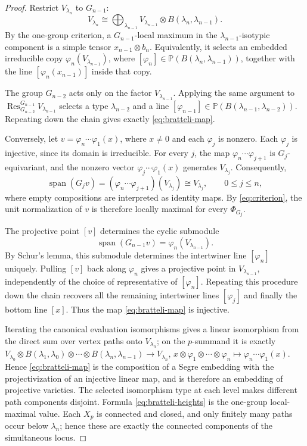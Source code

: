 \documentclass[10pt]{amsart}
\theoremstyle{remark}
\DeclareMathOperator{\Res}{Res}
\newcommand{\PP}{\mathbb P}
\begin{document}
\begin{proof}
Restrict $V_{\lambda_n}$ to $G_{n-1}$:
\[
 V_{\lambda_n}
 \cong
 \bigoplus_{\lambda_{n-1}}
 V_{\lambda_{n-1}}\otimes
 B(\lambda_n,\lambda_{n-1}).
\]
By the one-group criterion, a $G_{n-1}$-local maximum in the
$\lambda_{n-1}$-isotypic component is a simple tensor
$x_{n-1}\otimes b_n$. Equivalently, it selects an embedded irreducible copy
$\varphi_n(V_{\lambda_{n-1}})$, where
$[\varphi_n]\in\PP(B(\lambda_n,\lambda_{n-1}))$, together with the line
$[\varphi_n(x_{n-1})]$ inside that copy.

The group $G_{n-2}$ acts only on the factor $V_{\lambda_{n-1}}$. Applying the same argument to
$\Res^{G_{n-1}}_{G_{n-2}}V_{\lambda_{n-1}}$ selects a type $\lambda_{n-2}$ and a line
$[\varphi_{n-1}]\in\PP(B(\lambda_{n-1},\lambda_{n-2}))$. Repeating down the chain gives exactly
\eqref{eq:bratteli-map}.

Conversely, let $v=\varphi_n\cdots\varphi_1(x)$,
where $x\neq 0$ and each $\varphi_j$ is nonzero.
Each $\varphi_j$ is injective, since its domain is irreducible.
For every $j$, the map $\varphi_n\cdots\varphi_{j+1}$
is $G_j$-equivariant, and the nonzero vector
$\varphi_j\cdots\varphi_1(x)$ generates $V_{\lambda_j}$.
Consequently,
\[
 \operatorname{span}(G_jv)
 =
 (\varphi_n\cdots\varphi_{j+1})(V_{\lambda_j})
 \cong V_{\lambda_j},
 \qquad 0\leq j\leq n,
\]
where empty compositions are interpreted as identity maps.
By \eqref{eq:criterion}, the unit normalization of $v$
is therefore locally maximal for every $\Phi_{G_j}$.

The projective point $[v]$ determines the cyclic submodule
\[
 \operatorname{span}(G_{n-1}v)
 =
 \varphi_n(V_{\lambda_{n-1}}).
\]
By Schur's lemma, this submodule determines the
intertwiner line $[\varphi_n]$ uniquely.
Pulling $[v]$ back along $\varphi_n$ gives a projective
point in $V_{\lambda_{n-1}}$, independently of the
choice of representative of $[\varphi_n]$.
Repeating this procedure down the chain recovers
all the remaining intertwiner lines $[\varphi_j]$
and finally the bottom line $[x]$.
Thus the map \eqref{eq:bratteli-map} is injective.

Iterating the canonical evaluation isomorphisms gives a linear isomorphism from the direct sum over vertex
paths onto $V_{\lambda_n}$; on the $p$-summand it is exactly
$V_{\lambda_0}\otimes B(\lambda_1,\lambda_0)\otimes\cdots\otimes B(\lambda_n,\lambda_{n-1})
\longrightarrow V_{\lambda_n}$,
$x\otimes\varphi_1\otimes\cdots\otimes\varphi_n\mapsto\varphi_n\cdots\varphi_1(x)$.
Hence \eqref{eq:bratteli-map} is the composition of a Segre embedding with the projectivization of an
injective linear map, and is therefore an embedding of projective varieties. The selected isomorphism type at each level makes different path components
disjoint. Formula \eqref{eq:bratteli-heights} is
the one-group local-maximal value. Each $X_p$ is connected and closed, and only finitely many
paths occur below $\lambda_n$; hence these are exactly the connected components of the simultaneous locus.
\end{proof}
\end{document}
